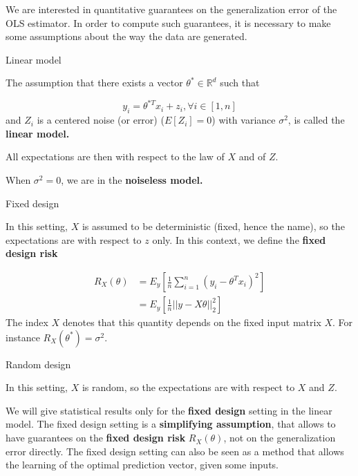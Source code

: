 \documentclass[
10pt, %
a4paper, %
oneside, %
headinclude,footinclude, %
BCOR5mm, %
]{scrartcl}
\begin{document}
We are interested in quantitative guarantees on the generalization error of the OLS estimator. In order to compute such guarantees, it is necessary to make some assumptions about the way the data are generated.

\begin{definition}{Linear model}

    The assumption that there exists a vector $ \theta^*\in \mathbb{R}^d$ such that 

    \begin{equation*}
	y_i = \theta^{*T}x_i+z_i, \forall i\in [1, n]
    \end{equation*}
    and $Z_i$ is a centered noise (or error)  ($E[Z_i]=0$) with variance $ \sigma^2$, is called the \textbf{{linear model.}} 
\end{definition}

All expectations are then with respect to the law of $X$ and of $Z$.

\begin{remark}

    When $\sigma^2=0$, we are in the \textbf{{noiseless model.}} 
    
\end{remark}

\begin{definition}{Fixed design}

    In this setting, $X$ is assumed to be deterministic (fixed, hence the name), so the expectations are with respect to $z$ only. In this context, we define the \textbf{{fixed design risk}} 

    \begin{equation}
	\begin{aligned}
	    \label{eq:}
	    R_X(\theta)    &= E_y[ \frac{1}{n} \sum^{n}_{i=1} (y_i-\theta^Tx_i)^2]\\
	    &= E_y[ \frac{1}{n} ||y-X\theta||_2^2]
	\end{aligned}
    \end{equation}
    The index $X$ denotes that this quantity depends on the fixed input matrix $X$. For instance $ R_X(\theta^*) = \sigma^2$. 
\end{definition}

\begin{definition}{Random design}

    In this setting, $X$ is random, so the expectations are with respect to $X$ and $Z$.
\end{definition}

We will give statistical results only for the \textbf{{fixed design}} setting in the linear model. The fixed design setting is a \textbf{{simplifying assumption}}, that allows to have guarantees on the \textbf{{fixed design risk}} $R_X(\theta)$, not on the generalization error directly. The fixed design setting can also be seen as a method that allows the learning of the optimal prediction vector, given some inputs.
\end{document}
